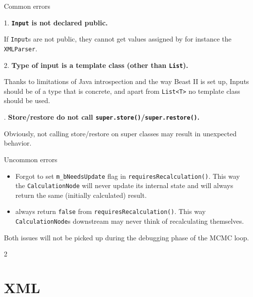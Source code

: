 \documentclass{beamer}
\def\part{2}
\theoremstyle{definition}
\begin{document}
\begin{frame}{Common errors}

1. {\bf\color{red} {\tt Input} is not declared public.}

If {\tt Input}s are not public, they cannot get values assigned by for
instance the {\tt XMLParser}.\vskip1cm

\pause

2. {\bf\color{red} Type of input is a template class (other than {\tt List}).}

Thanks to limitations of Java introspection and the way Beast II is set up, Inputs should be 
of a type that is concrete, and apart from {\tt List<T>} no template class should be used.\vskip1cm

. {\bf\color{red} Store/restore do not call {\tt super.store()}/{\tt super.restore()}.}

Obviously, not calling store/restore on super classes may result in unexpected behavior.

\end{frame}

\begin{frame}{Uncommon errors}
\begin{itemize}
\item Forgot to set {\tt m_bNeedsUpdate} flag in {\tt requiresRecalculation()}. This way
the {\tt CalculationNode} will never update its internal state and will always return the
same (initially calculated) result.
\item always return {\tt false} from {\tt requiresRecalculation()}. This way {\tt CalculationNode}s 
downstream may never think of recalculating themselves.
\end{itemize}
Both issues will not be picked up during the debugging phase
of the MCMC loop.

\end{frame}



\fi
\if \part 2




\section{XML}
\end{document}

